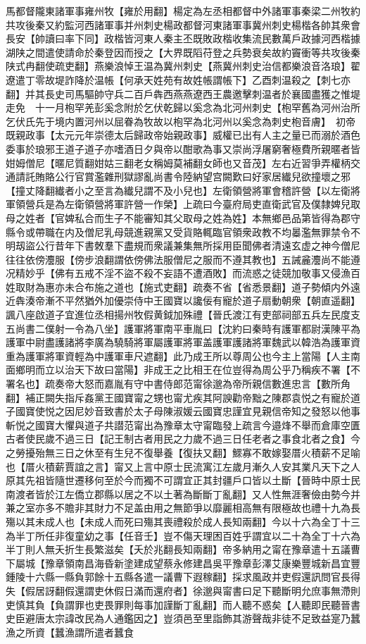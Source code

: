 馬都督隴東諸軍事雍州牧【雍於用翻】楊定為左丞相都督中外諸軍事秦梁二州牧約共攻後秦又約監河西諸軍事并州刺史楊政都督河東諸軍事冀州刺史楊楷各帥其衆會長安【帥讀曰率下同】政楷皆河東人秦主丕既敗政楷收集流民數萬戶政據河西楷據湖陕之間遣使請命於秦登因而授之【大界既䧟苻登之兵勢衰矣故約竇衝等共攻後秦陕式冉翻使疏吏翻】燕樂浪悼王温為冀州刺史【燕冀州刺史治信都樂浪音洛琅】翟遼遣丁零故堤詐降於温帳【何承天姓苑有故姓帳謂帳下】乙酉刺温殺之【刺七亦翻】并其長史司馬驅帥守兵二百戶犇西燕燕遼西王農邀擊刺温者於襄國盡獲之惟堤走免　十一月枹罕羌彭奚念附於乞伏乾歸以奚念為北河州刺史【枹罕舊為河州治所乞伏氏先于境内置河州以屈眷為牧故以枹罕為北河州以奚念為刺史枹音膚】　初帝既親政事【太元元年崇德太后歸政帝始親政事】威權已出有人主之量已而溺於酒色委事於琅邪王道子道子亦嗜酒日夕與帝以酣歌為事又崇尚浮屠窮奢極費所親暱者皆姏姆僧尼【暱尼質翻姏姑三翻老女稱姆莫補翻女師也又音茂】左右近習爭弄權柄交通請託賄賂公行官賞濫雜刑獄謬亂尚書令陸納望宫闕歎曰好家居纎兒欲撞壞之邪【撞丈降翻纎者小之至言為纎兒謂不及小兒也】左衛領營將軍會稽許營【以左衛將軍領營兵是為左衛領營將軍許營一作榮】上疏曰今臺府局吏直衛武官及僕隸婢兒取母之姓者【官婢私合而生子不能審知其父取母之姓為姓】本無鄉邑品第皆得為郡守縣令或帶職在内及僧尼乳母競進親黨又受貨賂輒臨官領衆政教不均㬥濫無罪禁令不明刼盜公行昔年下書敇羣下盡規而衆議兼集無所採用臣聞佛者清遠玄虚之神今僧尼往往依傍灋服【傍步浪翻謂依傍佛法服僧尼之服而不遵其教也】五誡麄灋尚不能遵况精妙乎【佛有五戒不淫不盜不殺不妄語不遭酒敗】而流惑之徒競加敬事又侵漁百姓取財為惠亦未合布施之道也【施式吏翻】疏奏不省【省悉景翻】道子勢傾内外遠近犇湊帝漸不平然猶外加優崇侍中王國寶以讒佞有寵於道子扇動朝衆【朝直遥翻】諷八座啟道子宜進位丞相揚州牧假黄鉞加殊禮【晉氏渡江有吏部祠部五兵左民度支五尚書二僕射一令為八坐】護軍將軍南平車胤曰【沈約曰秦時有護軍都尉漢陳平為護軍中尉盡護諸將李廣為驍騎將軍屬護軍將軍盖護軍護諸將軍魏武以韓浩為護軍資重為護軍將軍資輕為中護軍車尺遮翻】此乃成王所以尊周公也今主上當陽【人主南面鄉明而立以治天下故曰當陽】非成王之比相王在位豈得為周公乎乃稱疾不署【不署名也】疏奏帝大怒而嘉胤有守中書侍郎范甯徐邈為帝所親信數進忠言【數所角翻】補正闕失指斥姦黨王國寶甯之甥也甯尤疾其阿諛勸帝黜之陳郡袁悦之有寵於道子國寶使悦之因尼妙音致書於太子母陳淑媛云國寶忠謹宜見親信帝知之發怒以他事斬悦之國寶大懼與道子共譛范甯出為豫章太守甯臨發上疏言今邉烽不舉而倉庫空匱古者使民歲不過三日【記王制古者用民之力歲不過三日任老者之事食北者之食】今之勞擾殆無三日之休至有生兒不復舉養【復扶又翻】鰥寡不敢嫁娶厝火積薪不足喻也【厝火積薪賈誼之言】甯又上言中原士民流寓江左歲月漸久人安其業凡天下之人原其先祖皆隨世遷移何至於今而獨不可謂宜正其封疆戶口皆以土斷【晉時中原士民南渡者皆於江左僑立郡縣以居之不以土著為斷斷丁亂翻】又人性無涯奢儉由勢今并兼之室亦多不贍非其財力不足盖由用之無節爭以靡麗相高無有限極故也禮十九為長殤以其未成人也【未成人而死曰殤其喪禮殺於成人長知兩翻】今以十六為全丁十三為半丁所任非復童幼之事【任音壬】豈不傷天理困百姓乎謂宜以二十為全丁十六為半丁則人無夭折生長繁滋矣【夭於兆翻長知兩翻】帝多納用之甯在豫章遣十五議曹下屬城【豫章領南昌海昏新塗建成望蔡永修建昌吳平豫章彭澤艾康樂豐城新昌宜豐鍾陵十六縣一縣負郭餘十五縣各遣一議曹下遐稼翻】採求風政并吏假還訊問官長得失【假居訝翻假還謂吏休假日滿而還府者】徐邈與甯書曰足下聽斷明允庶事無滯則吏慎其負【負謂罪也吏畏罪則每事加謹斷丁亂翻】而人聽不惑矣【人聽即民聽晉書史臣避唐太宗諱改民為人通鑑因之】豈須邑至里詣飾其游聲哉非徒不足致益寔乃蠶漁之所資【蠶漁謂所遣者蠶食